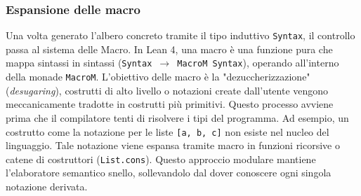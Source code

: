 \subsubsection{Espansione delle macro}
Una volta generato l'albero concreto tramite il tipo induttivo \texttt{Syntax}, il controllo passa al sistema delle Macro. In Lean 4, una macro è una funzione
pura che mappa sintassi in sintassi (\texttt{Syntax $\rightarrow$ MacroM Syntax}), operando all'interno della monade \texttt{MacroM}. L'obiettivo delle macro è 
la "dezuccherizzazione" (\textit{desugaring}), costrutti di alto livello o notazioni create dall'utente vengono meccanicamente tradotte in costrutti più primitivi. 
Questo processo avviene prima che il compilatore tenti di risolvere i tipi del programma. Ad esempio, un costrutto come la notazione per le liste \texttt{[a, b, c]} 
non esiste nel nucleo del linguaggio. Tale notazione viene espansa tramite macro in funzioni ricorsive o catene di costruttori (\texttt{List.cons}). Questo approccio 
modulare mantiene l'elaboratore semantico snello, sollevandolo dal dover conoscere ogni singola notazione derivata.

